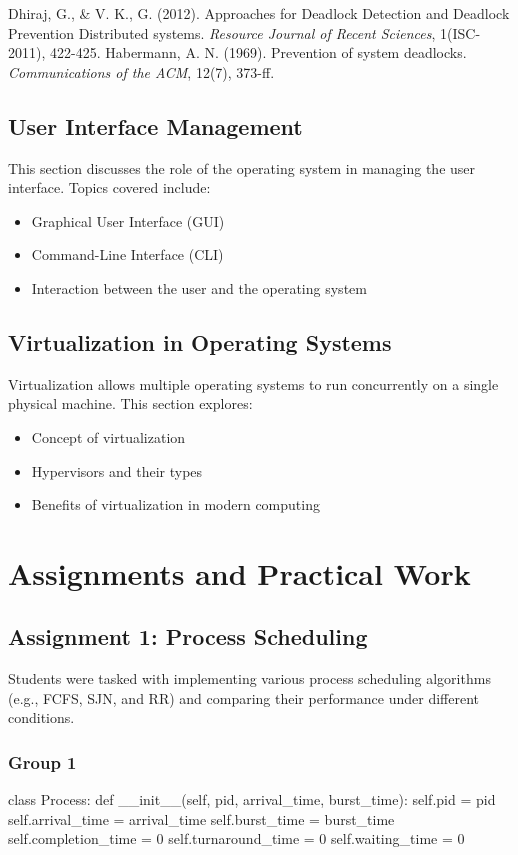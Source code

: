 \documentclass[12pt]{article}
\begin{document}
\begin{thebibliography}{5}
     Dhiraj, G., & V. K., G. (2012). Approaches for Deadlock Detection and Deadlock Prevention Distributed systems. \textit{Resource Journal of Recent Sciences}, 1(ISC-2011), 422-425.
     Habermann, A. N. (1969). Prevention of system deadlocks. \textit{Communications of the ACM}, 12(7), 373-ff.

    \end{thebibliography}


\subsection{User Interface Management}
This section discusses the role of the operating system in managing the user interface. Topics covered include:
\begin{itemize}
    \item Graphical User Interface (GUI)
    \item Command-Line Interface (CLI)
    \item Interaction between the user and the operating system
\end{itemize}

\subsection{Virtualization in Operating Systems}
Virtualization allows multiple operating systems to run concurrently on a single physical machine. This section explores:
\begin{itemize}
    \item Concept of virtualization
    \item Hypervisors and their types
    \item Benefits of virtualization in modern computing
\end{itemize}

\section{Assignments and Practical Work}
\subsection{Assignment 1: Process Scheduling}
Students were tasked with implementing various process scheduling algorithms (e.g., FCFS, SJN, and RR) and comparing their performance under different conditions.
\subsubsection{Group 1}
\begin{python}
    class Process:
    def __init__(self, pid, arrival_time, burst_time):
        self.pid = pid
        self.arrival_time = arrival_time
        self.burst_time = burst_time
        self.completion_time = 0
        self.turnaround_time = 0
        self.waiting_time = 0
\end{python}
\end{document}
